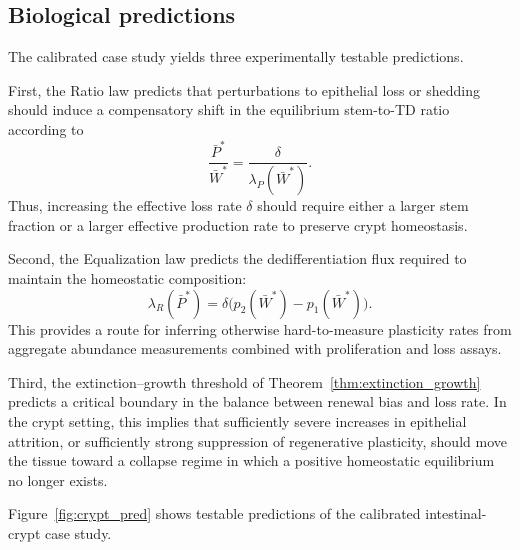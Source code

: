 \documentclass[pdflatex,sn-mathphys-ay]{sn-jnl}
\theoremstyle{thmstyleone}
\theoremstyle{definition}
\theoremstyle{remark}
\begin{document}
\subsection{Biological predictions}
\label{subsec:crypt_predictions}

The calibrated case study yields three experimentally testable predictions.

First, the Ratio law predicts that perturbations to epithelial loss or shedding should
induce a compensatory shift in the equilibrium stem-to-TD ratio according to
\[
\frac{\bar P^*}{\bar W^*}=\frac{\delta}{\lambda_P(\bar W^*)}.
\]
Thus, increasing the effective loss rate $\delta$ should require either a larger stem
fraction or a larger effective production rate to preserve crypt homeostasis.

Second, the Equalization law predicts the dedifferentiation flux required to maintain
the homeostatic composition:
\[
\lambda_R(\bar P^*)=\delta\bigl(p_2(\bar W^*)-p_1(\bar W^*)\bigr).
\]
This provides a route for inferring otherwise hard-to-measure plasticity rates from
aggregate abundance measurements combined with proliferation and loss assays.

Third, the extinction--growth threshold of
Theorem~\ref{thm:extinction_growth} predicts a critical boundary in the balance between
renewal bias and loss rate. In the crypt setting, this implies that sufficiently severe
increases in epithelial attrition, or sufficiently strong suppression of regenerative
plasticity, should move the tissue toward a collapse regime in which a positive
homeostatic equilibrium no longer exists.

Figure~\ref{fig:crypt_pred} shows testable predictions of the calibrated intestinal-crypt case study.
\end{document}
